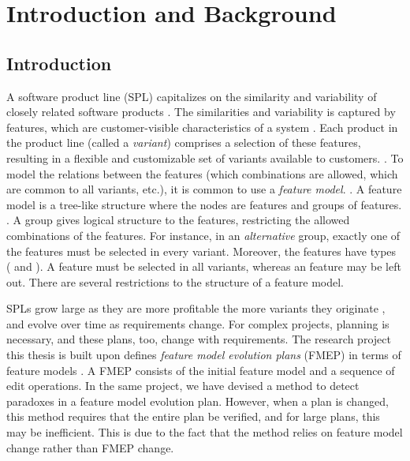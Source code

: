 \part{Introduction and Background}

\chapter{Introduction}

A software product line (SPL) capitalizes on the similarity and variability of closely related software products \cite{book:introduction-to-spl}. The similarities and variability is captured by features, which are customer-visible characteristics of a system \cite{book:introduction-to-spl}. Each product in the product line (called a \textit{variant}) comprises a selection of these features, resulting in a flexible and customizable set of variants available to customers. . To model the relations between the features (which combinations are allowed, which are common to all variants, etc.), it is common to use a \emph{feature model}. . A feature model is a tree-like structure where the nodes are features and groups of features. . A group gives logical structure to the features, restricting the allowed combinations of the features. For instance, in an \emph{alternative} group, exactly one of the features must be selected in every variant. Moreover, the features have types (\optional{} and \mandatory{}). A \mandatory{} feature must be selected in all variants, whereas an \optional{} feature may be left out. There are several restrictions to the structure of a feature model. 

SPLs grow large as they are more profitable the more variants they originate \cite{book:introduction-to-spl}, %
and evolve over time as requirements change. For complex projects, planning is necessary, and these plans, too, change with requirements. The research project this thesis is built upon defines \emph{feature model evolution plans} (FMEP) in terms of feature models \cite{art:consistency-preserving-evolution-planning}. A FMEP consists of the initial feature model and a sequence of edit operations. In the same project, we have devised a method to detect paradoxes in a feature model evolution plan.  However, when a plan is changed, this method requires that the entire plan be verified, and for large plans, this may be inefficient. This is due to the fact that the method relies on feature model change rather than FMEP change. 



